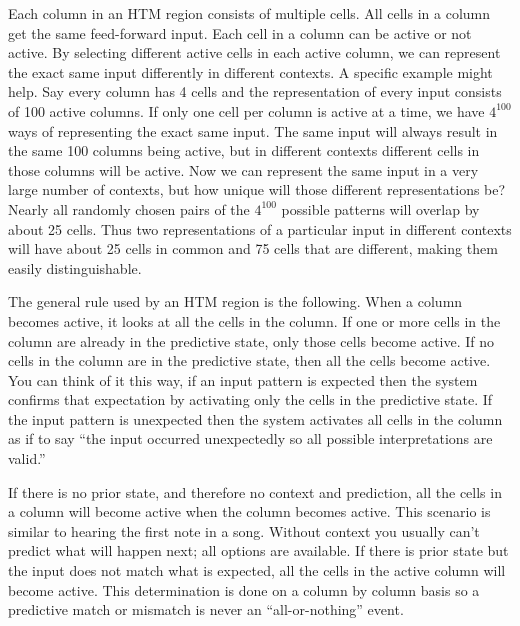 \documentclass{report}
\begin{document}
\begin{enumerate}
Each column in an HTM region consists of multiple cells. All cells in
a column get the same feed-forward input. Each cell in a column can be
active or not active. By selecting different active cells in each
active column, we can represent the exact same input differently in
different contexts. A specific example might help. Say every column
has 4 cells and the representation of every input consists of 100
active columns. If only one cell per column is active at a time, we
have $4^{100}$ ways of representing the exact same input. The same
input will always result in the same 100 columns being active, but in
different contexts different cells in those columns will be
active. Now we can represent the same input in a very large number of
contexts, but how unique will those different representations be?
Nearly all randomly chosen pairs of the $4^{100}$ possible patterns
will overlap by about 25 cells. Thus two representations of a
particular input in different contexts will have about 25 cells in
common and 75 cells that are different, making them easily
distinguishable.

The general rule used by an HTM region is the following. When a column
becomes active, it looks at all the cells in the column. If one or
more cells in the column are already in the predictive state, only
those cells become active. If no cells in the column are in the
predictive state, then all the cells become active. You can think of
it this way, if an input pattern is expected then the system confirms
that expectation by activating only the cells in the predictive
state. If the input pattern is unexpected then the system activates
all cells in the column as if to say ``the input occurred unexpectedly
so all possible interpretations are valid.''

If there is no prior state, and therefore no context and prediction,
all the cells in a column will become active when the column becomes
active. This scenario is similar to hearing the first note in a
song. Without context you usually can't predict what will happen next;
all options are available. If there is prior state but the input does
not match what is expected, all the cells in the active column will
become active. This determination is done on a column by column basis
so a predictive match or mismatch is never an ``all-or-nothing''
event.


\end{enumerate}
\end{document}

